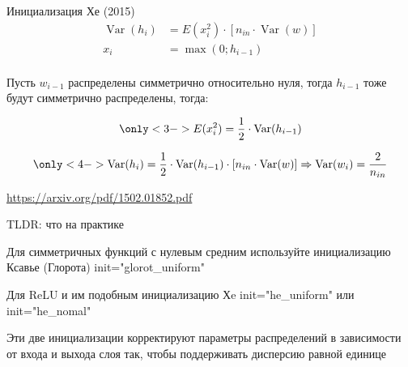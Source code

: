 \documentclass[notes,12pt, aspectratio=169]{beamer}
\newenvironment{wideitemize}{\itemize\addtolength{\itemsep}{10pt}}{\enditemize}
\DeclareMathOperator{\Var}{Var}
\begin{document}
\begin{frame}{Инициализация Хе (2015)}
	\begin{align*} 	
		\Var(h_i)  & =   E(x_i^2)  \cdot [n_{in} \cdot \Var(w)] \\
	x_i & = \max(0; h_{i-1}) \\ 
	\end{align*} \pause 

	 { Пусть $w_{i-1}$ распределены симметрично относительно нуля, тогда $h_{i-1}$ тоже будут симметрично распределены, тогда: }

	$$
	\only<3->{ E(x_i^2) = \frac{1}{2} \cdot \Var(h_{i-1}) }
	$$

	$$
	\only<4->{ \Var(h_i) =  \frac{1}{2} \cdot \Var(h_{i-1}) \cdot [n_{in} \cdot \Var(w)]  \Rightarrow \Var(w_i) = \frac{2}{n_{in}} }
	$$

	\vfill %
	\footnotesize
	{\color{blue} \url{https://arxiv.org/pdf/1502.01852.pdf}}
\end{frame}


\begin{frame}{TLDR: что на практике}
	\begin{wideitemize}
		\item  Для симметричных функций с нулевым средним используйте инициализацию Ксавье (Глорота) {\color{green}  init="glorot\_uniform"} 
		\item  Для ReLU и им подобным инициализацию Хe {\color{green} init="he\_uniform"} или {\color{green} init="he\_nomal"}
		\item  Эти две инициализации корректируют параметры распределений в зависимости от входа и выхода слоя так, чтобы поддерживать дисперсию равной единице
	\end{wideitemize}
\end{frame}
\end{document}
